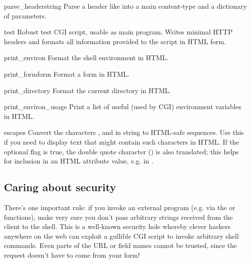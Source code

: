 \begin{funcdesc}{parse_header}{string}
Parse a header like  into a main
content-type and a dictionary of parameters.
\end{funcdesc}

\begin{funcdesc}{test}{}
Robust test CGI script, usable as main program.
Writes minimal HTTP headers and formats all information provided to
the script in HTML form.
\end{funcdesc}

\begin{funcdesc}{print_environ}{}
Format the shell environment in HTML.
\end{funcdesc}

\begin{funcdesc}{print_form}{form}
Format a form in HTML.
\end{funcdesc}

\begin{funcdesc}{print_directory}{}
Format the current directory in HTML.
\end{funcdesc}

\begin{funcdesc}{print_environ_usage}{}
Print a list of useful (used by CGI) environment variables in
HTML.
\end{funcdesc}

\begin{funcdesc}{escape}{s}
Convert the characters
\character{\&}, \character{<} and \character{>} in string  to
HTML-safe sequences.  Use this if you need to display text that might
contain such characters in HTML.  If the optional flag  is
true, the double quote character () is also translated;
this helps for inclusion in an HTML attribute value, e.g. in .
\end{funcdesc}


\subsection{Caring about security}

There's one important rule: if you invoke an external program (e.g.
via the  or  functions),
make very sure you don't pass arbitrary strings received from the
client to the shell.  This is a well-known security hole whereby
clever hackers anywhere on the web can exploit a gullible CGI script
to invoke arbitrary shell commands.  Even parts of the URL or field
names cannot be trusted, since the request doesn't have to come from
your form!


